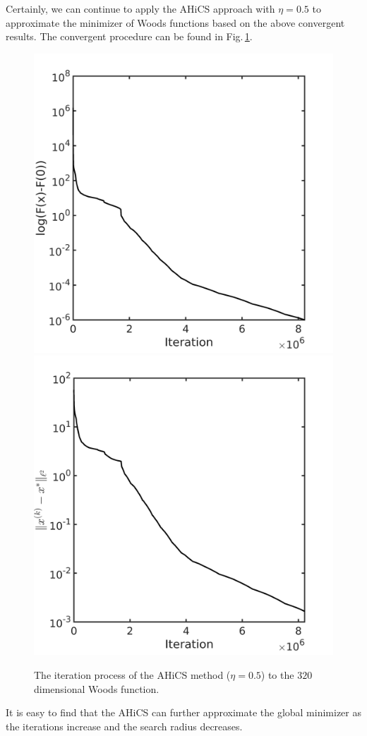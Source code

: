 \documentclass[final,1p,times]{elsarticle}
\begin{document}
Certainly, we can continue to apply the AHiCS approach with
$\eta=0.5$ to approximate the minimizer of Woods functions based
on the above convergent results. The convergent procedure can be
found in Fig.\,\ref{fig:woods}.
\begin{figure}[!htbp]
	\centering
	  \includegraphics[scale=0.15]{../figures/woods320D.png}
	  \includegraphics[scale=0.15]{../figures/woods320D_dist.png}
  \caption{The iteration process of the AHiCS method
  ($\eta=0.5$) to the $320$ dimensional Woods function.}
	\label{fig:woods}
\end{figure}
It is easy to find that the AHiCS can further approximate the
global minimizer as the iterations increase and the search radius
decreases.
\end{document}
